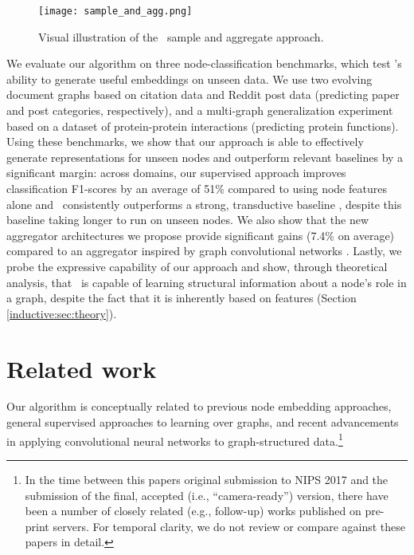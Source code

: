\begin{figure}
\vspace{-20pt}
\centering
\texttt{[image: sample\_and\_agg.png]}
\caption{Visual illustration of the \name\ sample and aggregate approach.}
\vspace{-15pt}
\label{fig:overview}
\end{figure}


We evaluate our algorithm on three node-classification benchmarks, which test \name's ability to generate useful embeddings on unseen data. 
We use two evolving document graphs based on citation data and Reddit post data (predicting paper and post categories, respectively), and a multi-graph generalization experiment based on a dataset of protein-protein interactions (predicting protein functions). 
  Using these benchmarks, we show that our approach is able to effectively generate representations for unseen nodes and outperform relevant baselines by a significant margin: across domains, our supervised approach improves classification F1-scores by an average of 51\% compared to using node features alone and \name\ consistently outperforms a strong, transductive baseline \cite{perozzi2014deepwalk}, despite this baseline taking  longer to run on unseen nodes.
We also show that the new aggregator architectures we propose provide significant gains (7.4\% on average) compared to an aggregator inspired by graph convolutional networks \cite{kipf2016semi}.
 Lastly, we probe the expressive capability of our approach and show, through theoretical analysis, that \name\ is capable of learning structural information about a node's role in a graph, despite the fact that it is inherently based on features (Section \ref{inductive:sec:theory}). 

\section{Related work}

Our algorithm is conceptually related to previous node embedding approaches, general supervised approaches to learning over graphs, and recent advancements in applying convolutional neural networks to graph-structured data.\footnote{In the time between this papers original submission to NIPS 2017 and the submission of the final, accepted (i.e., ``camera-ready'') version, there have been a number of closely related (e.g., follow-up) works published on pre-print servers. For temporal clarity, we do not review or compare against these papers in detail.}

